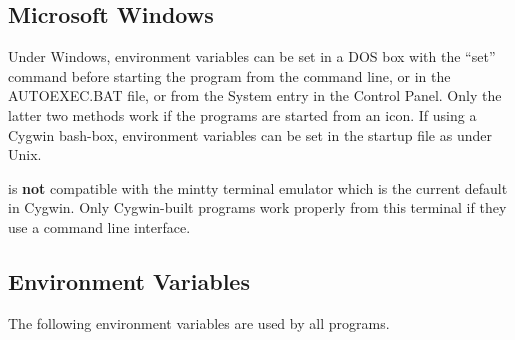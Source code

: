 \subsection{Microsoft Windows}

Under Windows, environment variables can be set in a DOS box with the
``{\vt set}'' command before starting the program from the command
line, or in the {\vt AUTOEXEC.BAT} file, or from the {\cb System}
entry in the {\cb Control Panel}.  Only the latter two methods work if
the programs are started from an icon.  If using a Cygwin bash-box,
environment variables can be set in the startup file as under Unix.

{\WRspice} is {\bf not} compatible with the {\vt mintty} terminal
emulator which is the current default in Cygwin.  Only Cygwin-built
programs work properly from this terminal if they use a command line
interface.

\subsection{{\WRspice} Environment Variables}

The following environment variables are used by all {\XicTools}
programs.

